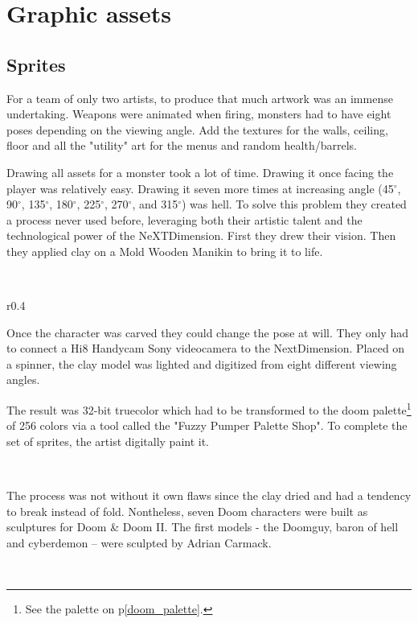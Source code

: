 \section{Graphic assets}

\subsection{Sprites}
For a team of only two artists, to produce that much artwork was an immense undertaking. Weapons were animated when firing, monsters had to have eight poses depending on the viewing angle. Add the textures for the walls, ceiling, floor and all the "utility" art for the menus and random health/barrels.\\
\par
Drawing all assets for a monster took a lot of time. Drawing it once facing the player was relatively easy. Drawing it seven more times at increasing angle (45$^{\circ}$, 90$^{\circ}$, 135$^{\circ}$, 180$^{\circ}$, 225$^{\circ}$, 270$^{\circ}$, and 315$^{\circ}$) was hell. To solve this problem they created a process never used before, leveraging both their artistic talent and the technological power of the NeXTDimension. First they drew their vision. Then they applied clay on a Mold Wooden Manikin to bring it to life.\\
\par


\\
\par

\begin{wrapfigure}[9]{r}{0.4\textwidth}
\centering
{}
\end{wrapfigure}
Once the character was carved they could change the pose at will. They only had to connect a Hi8 Handycam Sony videocamera to the NextDimension. Placed on a spinner, the clay model was lighted and digitized from eight different viewing angles.\\
\par
The result was 32-bit truecolor which had to be transformed to the doom palette\footnote{See the \doom palette on p\ref{doom_palette}.} of 256 colors via a tool called the "Fuzzy Pumper Palette Shop". To complete the set of sprites, the artist digitally paint it.\\
\par
{}\\
\par
The process was not without it own flaws since the clay dried and had a tendency to break instead of fold. Nontheless, seven Doom characters were built as sculptures for Doom \& Doom II. The first models - the Doomguy, baron of hell and cyberdemon -- were sculpted by Adrian Carmack.  \\
\par
{}\\
\pagebreak

